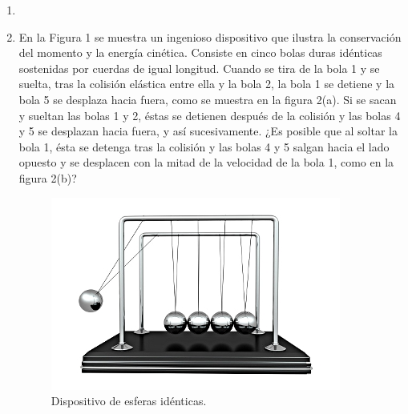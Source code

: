 \documentclass[letterpaper,11pt]{article}
\begin{document}
\vspace{-1cm}
\begin{enumerate}\setlength{\itemsep}{0.4cm}


\item[]

\item En la Figura 1 se muestra un ingenioso dispositivo que ilustra la conservación del momento y la energía cinética. Consiste en cinco bolas duras idénticas sostenidas por cuerdas de igual longitud. Cuando se tira de la bola 1 y se suelta, tras la colisión elástica entre ella y la bola 2, la bola 1 se detiene y la bola 5 se desplaza hacia fuera, como se muestra en la figura 2(a). Si se sacan y sueltan las bolas 1 y 2, éstas se detienen después de la colisión y las bolas 4 y 5 se desplazan hacia fuera, y así sucesivamente. ¿Es posible que al soltar la bola 1, ésta se detenga tras la colisión y las bolas 4 y 5 salgan hacia el lado opuesto y se desplacen con la mitad de la velocidad de la bola 1, como en la figura 2(b)?

\begin{figure}[H]
    \centering
    \includegraphics[width=0.5\linewidth]{2021-2/img/ejercicios/imagen_ej7_1.jpeg}
    \caption{Dispositivo de esferas idénticas.}
\end{figure}




\end{enumerate}
\end{document}
